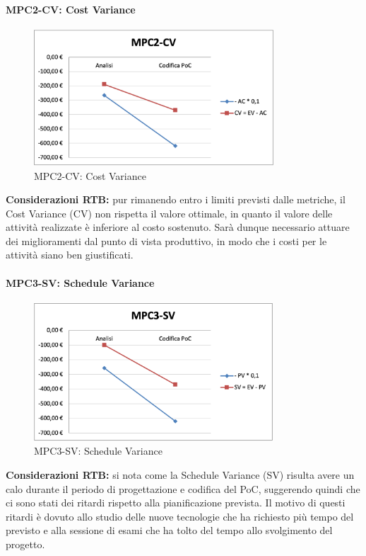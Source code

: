\paragraph{MPC2-CV: Cost Variance}
\begin{figure}[h!] 
    \centering
    \includegraphics[width=0.8\textwidth]{images/MPC2-CV.png}
    \caption{MPC2-CV: Cost Variance}
\end{figure}
\noindent \textbf{Considerazioni RTB:} pur rimanendo entro i limiti previsti dalle metriche, il Cost Variance (CV) non rispetta il valore ottimale, in quanto il valore delle attività realizzate è inferiore al costo sostenuto. Sarà dunque necessario attuare dei miglioramenti dal punto di vista produttivo, in modo che i costi per le attività siano ben giustificati.

\paragraph{MPC3-SV: Schedule Variance}
\begin{figure}[h!]
    \centering
    \includegraphics[width=0.8\textwidth]{images/MPC3-SV.png}
    \caption{MPC3-SV: Schedule Variance}
\end{figure}
\noindent \textbf{Considerazioni RTB:} si nota come la Schedule Variance (SV) risulta avere un calo durante il periodo di progettazione e codifica del PoC, suggerendo quindi che ci sono stati dei ritardi rispetto alla pianificazione prevista. Il motivo di questi ritardi è dovuto allo studio delle nuove tecnologie che ha richiesto più tempo del previsto e alla sessione di esami che ha tolto del tempo allo svolgimento del progetto.

